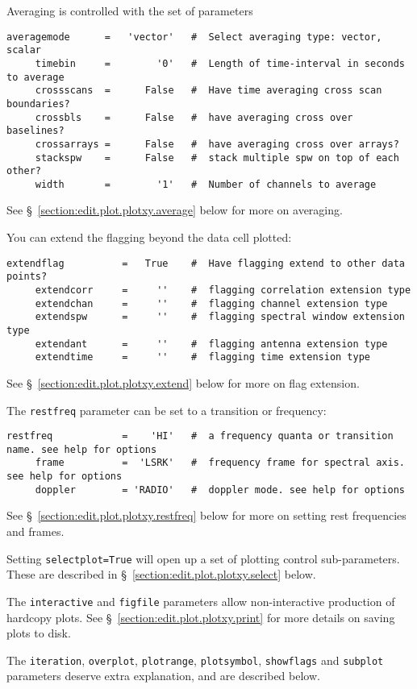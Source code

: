 Averaging is controlled with the set of parameters
\small
\begin{verbatim}
averagemode      =   'vector'   #  Select averaging type: vector, scalar
     timebin     =        '0'   #  Length of time-interval in seconds to average
     crossscans  =      False   #  Have time averaging cross scan boundaries?
     crossbls    =      False   #  have averaging cross over baselines?
     crossarrays =      False   #  have averaging cross over arrays?
     stackspw    =      False   #  stack multiple spw on top of each other?
     width       =        '1'   #  Number of channels to average
\end{verbatim}
\normalsize
See \S~\ref{section:edit.plot.plotxy.average} below for more on averaging.

You can extend the flagging beyond the data cell plotted:
\small
\begin{verbatim}
extendflag          =   True    #  Have flagging extend to other data points?
     extendcorr     =     ''    #  flagging correlation extension type
     extendchan     =     ''    #  flagging channel extension type
     extendspw      =     ''    #  flagging spectral window extension type
     extendant      =     ''    #  flagging antenna extension type
     extendtime     =     ''    #  flagging time extension type
\end{verbatim}
\normalsize
See \S~\ref{section:edit.plot.plotxy.extend} below for more on flag
extension.

The {\tt restfreq} parameter can be set to a transition or frequency:
\small
\begin{verbatim}
restfreq            =    'HI'   #  a frequency quanta or transition name. see help for options
     frame          =  'LSRK'   #  frequency frame for spectral axis. see help for options
     doppler        = 'RADIO'   #  doppler mode. see help for options
\end{verbatim}
\normalsize
See \S~\ref{section:edit.plot.plotxy.restfreq} below for more on setting rest
frequencies and frames.

Setting {\tt selectplot=True} will open up a set of plotting control
sub-parameters.  
These are described in \S~\ref{section:edit.plot.plotxy.select} below.

The {\tt interactive} and {\tt figfile} parameters allow
non-interactive production of hardcopy plots.  See
\S~\ref{section:edit.plot.plotxy.print} for more details on saving plots to disk.

The {\tt iteration}, {\tt overplot}, {\tt plotrange}, 
{\tt plotsymbol}, {\tt showflags} and {\tt subplot}
parameters deserve extra explanation, and are described below.

